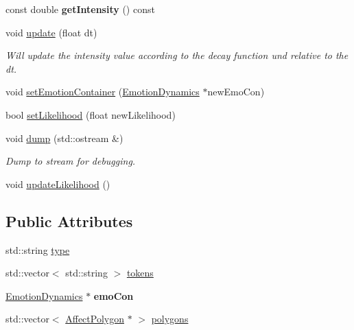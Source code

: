 \begin{DoxyCompactItemize}
\item 
\hypertarget{class_affective_state_ab37b59269cf599a28e0cb2f8aa083e38}{
const double {\bfseries get\-Intensity} () const }
\label{class_affective_state_ab37b59269cf599a28e0cb2f8aa083e38}

\item 
\hypertarget{class_affective_state_a82b0f96a1494f5c58a6bec2840f3728a}{
void \hyperlink{class_affective_state_a82b0f96a1494f5c58a6bec2840f3728a}{update} (float dt)}
\label{class_affective_state_a82b0f96a1494f5c58a6bec2840f3728a}

\begin{DoxyCompactList}\small\item\em \-Will update the intensity value according to the decay function und relative to the dt. \end{DoxyCompactList}\item 
void \hyperlink{class_affective_state_a0c6f905934f6abe08a64d3b25fe88ff1}{set\-Emotion\-Container} (\hyperlink{class_emotion_dynamics}{\-Emotion\-Dynamics} $\ast$new\-Emo\-Con)
\item 
bool \hyperlink{class_affective_state_a913bce75bbf5bb870207e69fefb5efef}{set\-Likelihood} (float new\-Likelihood)
\item 
\hypertarget{class_affective_state_abe11a841bcd9979d183a946b476142d8}{
void \hyperlink{class_affective_state_abe11a841bcd9979d183a946b476142d8}{dump} (std\-::ostream \&)}
\label{class_affective_state_abe11a841bcd9979d183a946b476142d8}

\begin{DoxyCompactList}\small\item\em \-Dump to stream for debugging. \end{DoxyCompactList}\item 
void \hyperlink{class_affective_state_add666df993512c3af62ad1b6b00cab18}{update\-Likelihood} ()
\end{DoxyCompactItemize}
\subsection*{\-Public \-Attributes}
\begin{DoxyCompactItemize}
\item 
std\-::string \hyperlink{class_affective_state_ad46f24a9835b890cfe147ae0463d01bf}{type}
\item 
std\-::vector$<$ std\-::string $>$ \hyperlink{class_affective_state_a80a1bb184121a40c28c1d3ff103fd47f}{tokens}
\item 
\hypertarget{class_affective_state_a755c41239bc7777bfcc962a12768b27e}{
\hyperlink{class_emotion_dynamics}{\-Emotion\-Dynamics} $\ast$ {\bfseries emo\-Con}}
\label{class_affective_state_a755c41239bc7777bfcc962a12768b27e}

\item 
std\-::vector$<$ \hyperlink{class_affect_polygon}{\-Affect\-Polygon} $\ast$ $>$ \hyperlink{class_affective_state_ac2ea3391ebe5fd5708aecb2acdb7fe0d}{polygons}
\end{DoxyCompactItemize}
